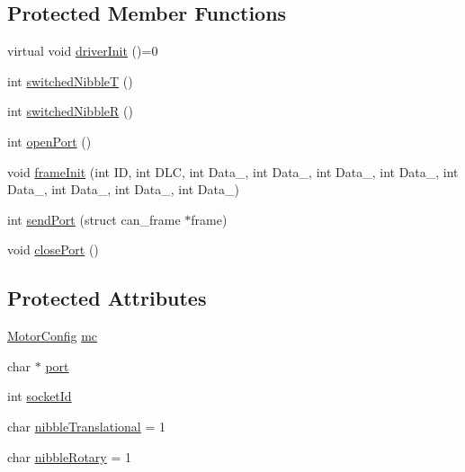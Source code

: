 \subsection*{Protected Member Functions}
\begin{DoxyCompactItemize}
\item 
virtual void \hyperlink{class_motor_communicator_interface_a8ba57825f67ba4e1230c73fec5882ec5}{driver\+Init} ()=0
\item 
int \hyperlink{class_motor_communicator_interface_ab86c8e346dc6efb006b62d3329559ae6}{switched\+NibbleT} ()
\item 
int \hyperlink{class_motor_communicator_interface_afe256f56dfb26e7abe1f2eb102e1129c}{switched\+NibbleR} ()
\item 
int \hyperlink{class_motor_communicator_interface_a9b611145c47f1d8842eb9411d9e0e95a}{open\+Port} ()
\item 
void \hyperlink{class_motor_communicator_interface_a833096f7dfe3a034f30f53fb6f380f3b}{frame\+Init} (int ID, int D\+LC, int Data\+\_, int Data\+\_, int Data\+\_, int Data\+\_, int Data\+\_, int Data\+\_, int Data\+\_, int Data\+\_)
\item 
int \hyperlink{class_motor_communicator_interface_a62511203d5a487dc7148c8f083d89d12}{send\+Port} (struct can\+\_\+frame $\ast$frame)
\item 
void \hyperlink{class_motor_communicator_interface_aa761210caa851871c73732955e1eadba}{close\+Port} ()
\end{DoxyCompactItemize}
\subsection*{Protected Attributes}
\begin{DoxyCompactItemize}
\item 
\hyperlink{class_motor_config}{Motor\+Config} \hyperlink{class_motor_communicator_interface_aae1e504fe7cce7e933b77d8e31a96878}{mc}
\item 
char $\ast$ \hyperlink{class_motor_communicator_interface_adde2a840f8e9cd2e43b34af2bf8c3719}{port}
\item 
int \hyperlink{class_motor_communicator_interface_ad4d2f463fa6182b86bee4852dcee3d3a}{socket\+Id}
\item 
char \hyperlink{class_motor_communicator_interface_ae3010f217b379f0f62ebd5fee8387f21}{nibble\+Translational} = 1
\item 
char \hyperlink{class_motor_communicator_interface_af57ae9b19b30f4e7fc07545629117ad9}{nibble\+Rotary} = 1
\end{DoxyCompactItemize}


